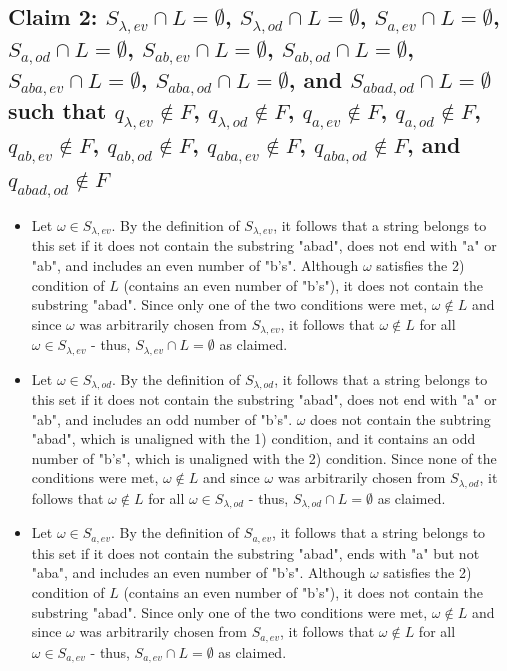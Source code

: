 \documentclass{article}
\begin{document}
\subsection*{Claim 2: $S_{\lambda,ev} \cap L = \emptyset$, $S_{\lambda,od} \cap L = \emptyset$, $S_{a,ev} \cap L = \emptyset$, $S_{a,od} \cap L = \emptyset$, $S_{ab,ev} \cap L = \emptyset$, 
$S_{ab,od} \cap L = \emptyset$, $S_{aba,ev} \cap L = \emptyset$, $S_{aba,od} \cap L = \emptyset$, and $S_{abad,od} \cap L = \emptyset$ such that $q_{\lambda,ev} \notin F$, $q_{\lambda,od} \notin F$, 
$q_{a,ev} \notin F$, $q_{a,od} \notin F$, $q_{ab,ev} \notin F$, $q_{ab,od} \notin F$, $q_{aba,ev} \notin F$, $q_{aba,od} \notin F$, and $q_{abad,od} \notin F$}
\begin{itemize}
    \item Let $\omega \in S_{\lambda,ev}$. By the definition of $S_{\lambda,ev}$, it follows that a string belongs to this set if it does not contain the substring "abad", does not end with "a" or "ab",
    and includes an even number of "b's". Although $\omega$ satisfies the 2) condition of $L$ (contains an even number of "b's"), it does not contain the substring "abad". Since only one of the two conditions 
    were met, $\omega \notin L$ and since $\omega$ was arbitrarily chosen from $S_{\lambda,ev}$, it follows that $\omega \notin L$ for all $\omega \in S_{\lambda,ev}$ - thus, $S_{\lambda,ev} \cap L = \emptyset$
    as claimed.

    \item Let $\omega \in S_{\lambda,od}$. By the definition of $S_{\lambda,od}$, it follows that a string belongs to this set if it does not contain the substring "abad", does not end with "a" or "ab",
    and includes an odd number of "b's". $\omega$ does not contain the subtring "abad", which is unaligned with the 1) condition, and it contains an odd number of "b's", which is unaligned with the 2) condition.
    Since none of the conditions were met, $\omega \notin L$ and since $\omega$ was arbitrarily chosen from $S_{\lambda,od}$, it follows that $\omega \notin L$ for all $\omega \in S_{\lambda,od}$ - thus, 
    $S_{\lambda,od} \cap L = \emptyset$ as claimed.

    \item Let $\omega \in S_{a,ev}$. By the definition of $S_{a,ev}$, it follows that a string belongs to this set if it does not contain the substring "abad", ends with "a" but not "aba",
    and includes an even number of "b's". Although $\omega$ satisfies the 2) condition of $L$ (contains an even number of "b's"), it does not contain the substring "abad". Since only one of the two conditions 
    were met, $\omega \notin L$ and since $\omega$ was arbitrarily chosen from $S_{a,ev}$, it follows that $\omega \notin L$ for all $\omega \in S_{a,ev}$ - thus, $S_{a,ev} \cap L = \emptyset$
    as claimed.


\end{itemize}
\end{document}
